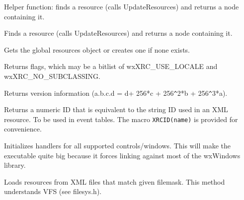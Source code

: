 Helper function: finds a resource (calls UpdateResources) and returns a node containing it.

\label{wxxmlresourcefindresource}


Finds a resource (calls UpdateResources) and returns a node containing it.

\label{wxxmlresourceget}


Gets the global resources object or creates one if none exists.

\label{wxxmlresourcegetflags}


Returns flags, which may be a bitlist of wxXRC\_USE\_LOCALE and wxXRC\_NO\_SUBCLASSING.

\label{wxxmlresourcegetversion}


Returns version information (a.b.c.d = d+ 256*c + 256\verb|^|2*b + 256\verb|^|3*a).

\label{wxxmlresourcegetxmlid}


Returns a numeric ID that is equivalent to the string ID used in an XML
resource. To be used in event tables.
The macro \verb$XRCID(name)$ is provided for convenience.

\label{wxxmlresourceinitallhandlers}


Initializes handlers for all supported controls/windows. This will
make the executable quite big because it forces linking against
most of the wxWindows library.

\label{wxxmlresourceload}


Loads resources from XML files that match given filemask.
This method understands VFS (see filesys.h).

